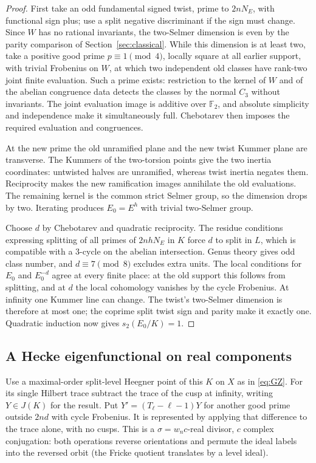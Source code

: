 \begin{proof}
First take an odd fundamental signed twist, prime to \(2nN_E\), with
functional sign plus; use a split negative discriminant if the sign
must change. Since \(W\) has no rational invariants, the two-Selmer
dimension is even by the parity comparison of
Section~\ref{sec:classical}.
While this dimension is at least two, take a positive good prime
\(p\equiv1\pmod4\), locally square at all earlier support, with trivial
Frobenius on \(W\), at which two independent old classes have rank-two
joint finite evaluation. Such a prime exists: restriction to the
kernel of \(W\) and of the abelian congruence data detects the classes
by the normal \(C_3\) without invariants. The joint evaluation image is
additive over \(\mathbb F_2\), and absolute simplicity and independence
make it simultaneously full. Chebotarev then imposes the required
evaluation and congruences.

At the new prime the old unramified plane and the new twist Kummer
plane are transverse. The Kummers of the two-torsion points give the
two inertia coordinates: untwisted halves are unramified, whereas
twist inertia negates them. Reciprocity makes the new ramification
images annihilate the old evaluations. The remaining kernel is the
common strict Selmer group, so the dimension drops by two. Iterating
produces \(E_0=E^h\) with trivial two-Selmer group.

Choose \(d\) by Chebotarev and quadratic reciprocity. The residue
conditions expressing splitting of all primes of \(2nhN_E\) in
\(K\) force \(d\) to split in \(L\), which is compatible with a
\(3\)-cycle on the abelian intersection. Genus theory gives odd class
number, and \(d\equiv7\pmod8\) excludes extra units. The local
conditions for \(E_0\) and \(E_0^{-d}\) agree at every finite place:
at the old support this follows from splitting, and at \(d\) the
local cohomology vanishes by the cycle Frobenius. At infinity one
Kummer line can change. The twist's two-Selmer dimension is therefore
at most one; the coprime split twist sign and parity make it exactly
one. Quadratic induction now gives \(s_2(E_0/K)=1\).
\end{proof}

\subsection{A Hecke eigenfunctional on real components}

Use a maximal-order split-level Heegner point of this \(K\) on \(X\) as in \eqref{eq:GZ}. For its single Hilbert trace subtract the trace of the cusp at infinity, writing \(Y\in J(K)\) for the result. Put \(Y'=(T_\ell-\ell-1)Y\) for another good prime outside \(2nd\) with cycle Frobenius. It is represented by applying that difference to the trace alone, with no cusps. This is a \(\sigma=w_n c\)-real divisor, \(c\) complex conjugation: both operations reverse orientations and permute the ideal labels into the reversed orbit (the Fricke quotient translates by a level ideal).

